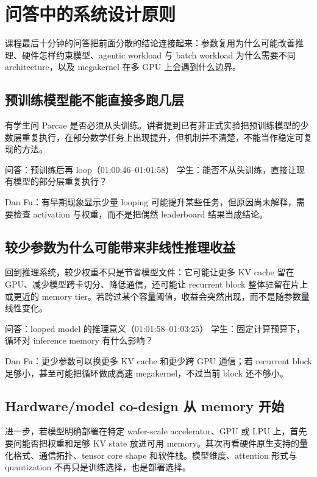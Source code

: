 \section{问答中的系统设计原则}

课程最后十分钟的问答把前面分散的结论连接起来：参数复用为什么可能改善推理、硬件怎样约束模型、agentic workload 与 batch workload 为什么需要不同 architecture，以及 megakernel 在多 GPU 上会遇到什么边界。

\subsection{预训练模型能不能直接多跑几层}

有学生问 Parcae 是否必须从头训练。讲者提到已有非正式实验把预训练模型的少数层重复执行，在部分数学任务上出现提升，但机制并不清楚，不能当作稳定可复现的方法。

\begin{dialoguebox}{问答：预训练后再 loop（01:00:46--01:01:58）}
学生：能否不从头训练，直接让现有模型的部分层重复执行？\par
Dan Fu：有早期现象显示少量 looping 可能提升某些任务，但原因尚未解释，需要检查 activation 与权重，而不是把偶然 leaderboard 结果当成结论。
\end{dialoguebox}

\subsection{较少参数为什么可能带来非线性推理收益}

回到推理系统，较少权重不只是节省模型文件：它可能让更多 KV cache 留在 GPU、减少模型跨卡切分、降低通信，还可能让 recurrent block 整体驻留在片上或更近的 memory tier。若跨过某个容量阈值，收益会突然出现，而不是随参数量线性变化。

\begin{dialoguebox}{问答：looped model 的推理意义（01:01:58--01:03:25）}
学生：固定计算预算下，循环对 inference memory 有什么影响？\par
Dan Fu：更少参数可以换更多 KV cache 和更少跨 GPU 通信；若 recurrent block 足够小，甚至可能把循环做成高速 megakernel，不过当前 block 还不够小。
\end{dialoguebox}

\subsection{Hardware/model co-design 从 memory 开始}

进一步，若模型明确部署在特定 wafer-scale accelerator、GPU 或 LPU 上，首先要问能否把权重和足够 KV state 放进可用 memory。其次再看硬件原生支持的量化格式、通信拓扑、tensor core shape 和软件栈。模型维度、attention 形式与 quantization 不再只是训练选择，也是部署选择。

